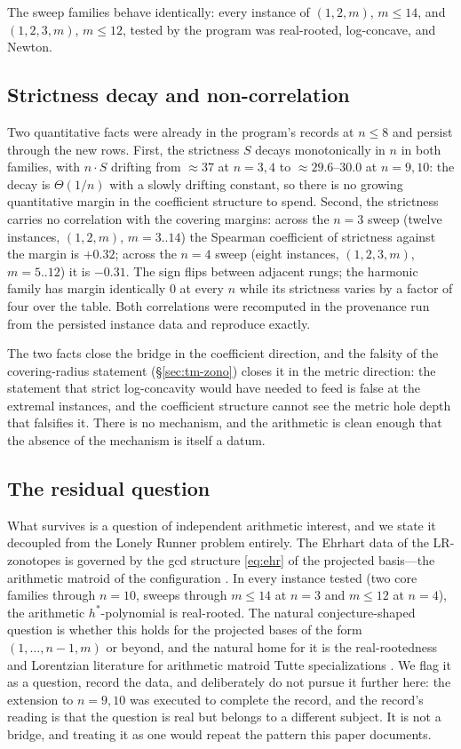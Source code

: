 The sweep families behave identically: every instance of $(1,2,m)$,
$m\le14$, and $(1,2,3,m)$, $m\le12$, tested by the program was
real-rooted, log-concave, and Newton.

\subsection{Strictness decay and non-correlation}

Two quantitative facts were already in the program's records at $n\le8$
and persist through the new rows. First, the strictness $S$ decays
monotonically in $n$ in both families, with $n\cdot S$ drifting from
$\approx37$ at $n=3,4$ to $\approx29.6$--$30.0$ at $n=9,10$: the decay
is $\Theta(1/n)$ with a slowly drifting constant, so there is no growing
quantitative margin in the coefficient structure to spend. Second, the
strictness carries no correlation with the covering margins: across the
$n=3$ sweep (twelve instances, $(1,2,m)$, $m=3..14$) the Spearman
coefficient of strictness against the margin is $+0.32$; across the
$n=4$ sweep (eight instances, $(1,2,3,m)$, $m=5..12$) it is $-0.31$.
The sign flips between adjacent rungs; the harmonic family has margin
identically $0$ at every $n$ while its strictness varies by a factor of
four over the table. Both correlations were recomputed in the provenance
run from the persisted instance data and reproduce exactly.

The two facts close the bridge in the coefficient direction, and the
falsity of the covering-radius statement (\S\ref{sec:tm-zono}) closes it
in the metric direction: the statement that strict log-concavity would
have needed to feed is false at the extremal instances, and the
coefficient structure cannot see the metric hole depth that falsifies
it. There is no mechanism, and the arithmetic is clean enough that the
absence of the mechanism is itself a datum.

\subsection{The residual question}

What survives is a question of independent arithmetic interest, and we
state it decoupled from the Lonely Runner problem entirely. The
Ehrhart data of the LR-zonotopes is governed by the gcd structure
\eqref{eq:ehr} of the projected basis---the arithmetic matroid of the
configuration \cite{dAMoci}. In every instance tested (two core
families through $n=10$, sweeps through $m\le14$ at $n=3$ and $m\le12$
at $n=4$), the arithmetic $h^*$-polynomial is real-rooted. The natural
conjecture-shaped question is whether this holds for the projected
bases of the form $(1,\dots,n-1,m)$ or beyond, and the natural home for
it is the real-rootedness and Lorentzian literature for arithmetic
matroid Tutte specializations \cite{BrandenHuh,dAMoci,StanleyEC}. We
flag it as a question, record the data, and deliberately do not pursue
it further here: the extension to $n=9,10$ was executed to complete the
record, and the record's reading is that the question is real but
belongs to a different subject. It is not a bridge, and treating it as
one would repeat the pattern this paper documents.
